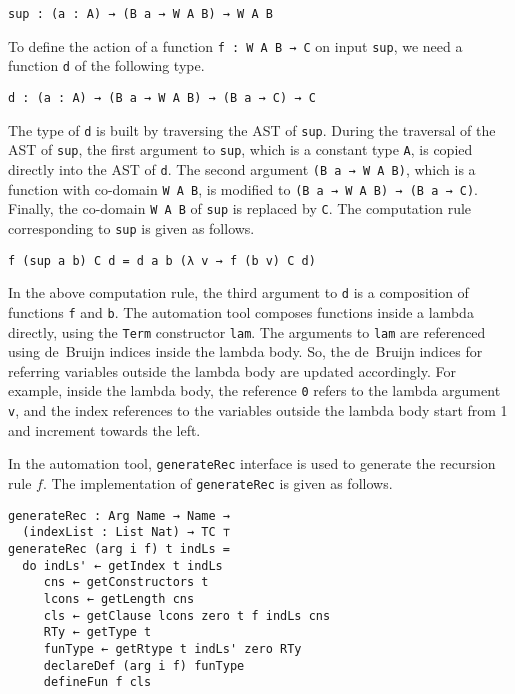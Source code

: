 \documentclass[sigplan,10pt]{acmart}
\begin{document}
\begin{center}
\begingroup
\begin{BVerbatim}
sup : (a : A) → (B a → W A B) → W A B
\end{BVerbatim}
\endgroup
\end{center}

To define the action of a function {\tt f : W A B → C} on input {\tt sup}, we need a function {\tt d} of the following type.
\begin{center}
\begingroup
\begin{BVerbatim}
d : (a : A) → (B a → W A B) → (B a → C) → C
\end{BVerbatim}
\endgroup
\end{center}

The type of {\tt d} is built by traversing the AST of {\tt sup}. During the traversal of the AST of {\tt sup}, the first argument to {\tt sup}, which is a constant type {\tt A}, is copied directly into the AST of {\tt d}. The second argument {\tt (B a  → W A B)}, which is a function with co-domain {\tt W A B}, is modified to {\tt (B a  → W A B) → (B a → C)}. Finally, the co-domain {\tt W A B} of {\tt sup} is replaced by {\tt C}. The computation rule corresponding to {\tt sup} is given as follows.
\begin{center}
\begingroup
\begin{BVerbatim}
f (sup a b) C d = d a b (λ v → f (b v) C d)
\end{BVerbatim}
\endgroup
\end{center}

In the above computation rule, the third argument to {\tt d} is a composition of functions {\tt f} and {\tt b}. The automation tool composes functions inside a lambda directly, using the \texttt{Term} constructor {\tt lam}. The arguments to {\tt lam} are referenced using de~Bruijn indices inside the lambda body. So, the de~Bruijn indices for referring variables outside the lambda body are updated accordingly. For example, inside the lambda body, the reference {\tt 0} refers to the lambda argument {\tt v}, and the index references to the variables outside the lambda body start from 1 and increment towards the left.

In the automation tool, {\tt generateRec} interface is used to generate the recursion rule $f$. The implementation of {\tt generateRec} is given as follows.

\begin{center}
\begingroup
\begin{BVerbatim}
generateRec : Arg Name → Name → 
  (indexList : List Nat) → TC ⊤
generateRec (arg i f) t indLs =
  do indLs' ← getIndex t indLs
     cns ← getConstructors t
     lcons ← getLength cns
     cls ← getClause lcons zero t f indLs cns
     RTy ← getType t
     funType ← getRtype t indLs' zero RTy
     declareDef (arg i f) funType
     defineFun f cls
\end{BVerbatim}
\endgroup
\end{center}
\end{document}
